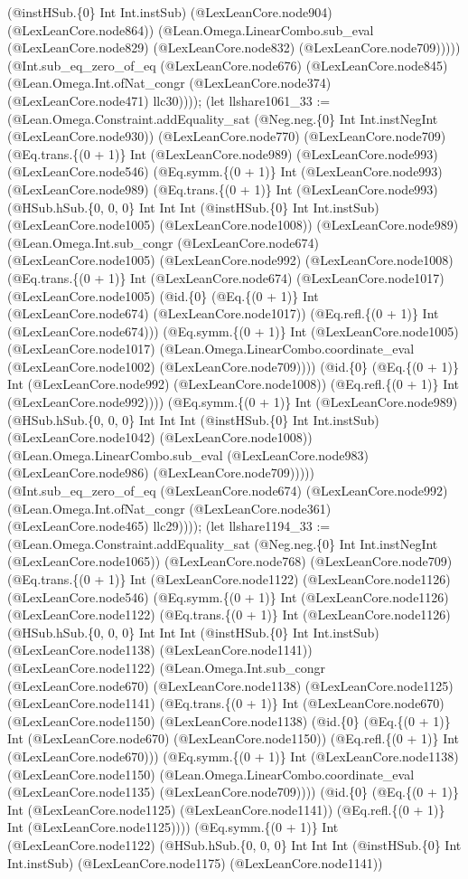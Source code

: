 \documentclass[11pt]{article}
\begin{document}
(@instHSub.\{0\} Int Int.instSub) (@LexLeanCore.node904) (@LexLeanCore.node864)) (@Lean.Omega.LinearCombo.sub\_eval (@LexLeanCore.node829) (@LexLeanCore.node832) (@LexLeanCore.node709))))) (@Int.sub\_eq\_zero\_of\_eq (@LexLeanCore.node676) (@LexLeanCore.node845) (@Lean.Omega.Int.ofNat\_congr (@LexLeanCore.node374) (@LexLeanCore.node471) llc30)))); (let llshare1061\_33 := (@Lean.Omega.Constraint.addEquality\_sat (@Neg.neg.\{0\} Int Int.instNegInt (@LexLeanCore.node930)) (@LexLeanCore.node770) (@LexLeanCore.node709) (@Eq.trans.\{(0 + 1)\} Int (@LexLeanCore.node989) (@LexLeanCore.node993) (@LexLeanCore.node546) (@Eq.symm.\{(0 + 1)\} Int (@LexLeanCore.node993) (@LexLeanCore.node989) (@Eq.trans.\{(0 + 1)\} Int (@LexLeanCore.node993) (@HSub.hSub.\{0, 0, 0\} Int Int Int (@instHSub.\{0\} Int Int.instSub) (@LexLeanCore.node1005) (@LexLeanCore.node1008)) (@LexLeanCore.node989) (@Lean.Omega.Int.sub\_congr (@LexLeanCore.node674) (@LexLeanCore.node1005) (@LexLeanCore.node992) (@LexLeanCore.node1008) (@Eq.trans.\{(0 + 1)\} Int (@LexLeanCore.node674) (@LexLeanCore.node1017) (@LexLeanCore.node1005) (@id.\{0\} (@Eq.\{(0 + 1)\} Int (@LexLeanCore.node674) (@LexLeanCore.node1017)) (@Eq.refl.\{(0 + 1)\} Int (@LexLeanCore.node674))) (@Eq.symm.\{(0 + 1)\} Int (@LexLeanCore.node1005) (@LexLeanCore.node1017) (@Lean.Omega.LinearCombo.coordinate\_eval (@LexLeanCore.node1002) (@LexLeanCore.node709)))) (@id.\{0\} (@Eq.\{(0 + 1)\} Int (@LexLeanCore.node992) (@LexLeanCore.node1008)) (@Eq.refl.\{(0 + 1)\} Int (@LexLeanCore.node992)))) (@Eq.symm.\{(0 + 1)\} Int (@LexLeanCore.node989) (@HSub.hSub.\{0, 0, 0\} Int Int Int (@instHSub.\{0\} Int Int.instSub) (@LexLeanCore.node1042) (@LexLeanCore.node1008)) (@Lean.Omega.LinearCombo.sub\_eval (@LexLeanCore.node983) (@LexLeanCore.node986) (@LexLeanCore.node709))))) (@Int.sub\_eq\_zero\_of\_eq (@LexLeanCore.node674) (@LexLeanCore.node992) (@Lean.Omega.Int.ofNat\_congr (@LexLeanCore.node361) (@LexLeanCore.node465) llc29)))); (let llshare1194\_33 := (@Lean.Omega.Constraint.addEquality\_sat (@Neg.neg.\{0\} Int Int.instNegInt (@LexLeanCore.node1065)) (@LexLeanCore.node768) (@LexLeanCore.node709) (@Eq.trans.\{(0 + 1)\} Int (@LexLeanCore.node1122) (@LexLeanCore.node1126) (@LexLeanCore.node546) (@Eq.symm.\{(0 + 1)\} Int (@LexLeanCore.node1126) (@LexLeanCore.node1122) (@Eq.trans.\{(0 + 1)\} Int (@LexLeanCore.node1126) (@HSub.hSub.\{0, 0, 0\} Int Int Int (@instHSub.\{0\} Int Int.instSub) (@LexLeanCore.node1138) (@LexLeanCore.node1141)) (@LexLeanCore.node1122) (@Lean.Omega.Int.sub\_congr (@LexLeanCore.node670) (@LexLeanCore.node1138) (@LexLeanCore.node1125) (@LexLeanCore.node1141) (@Eq.trans.\{(0 + 1)\} Int (@LexLeanCore.node670) (@LexLeanCore.node1150) (@LexLeanCore.node1138) (@id.\{0\} (@Eq.\{(0 + 1)\} Int (@LexLeanCore.node670) (@LexLeanCore.node1150)) (@Eq.refl.\{(0 + 1)\} Int (@LexLeanCore.node670))) (@Eq.symm.\{(0 + 1)\} Int (@LexLeanCore.node1138) (@LexLeanCore.node1150) (@Lean.Omega.LinearCombo.coordinate\_eval (@LexLeanCore.node1135) (@LexLeanCore.node709)))) (@id.\{0\} (@Eq.\{(0 + 1)\} Int (@LexLeanCore.node1125) (@LexLeanCore.node1141)) (@Eq.refl.\{(0 + 1)\} Int (@LexLeanCore.node1125)))) (@Eq.symm.\{(0 + 1)\} Int (@LexLeanCore.node1122) (@HSub.hSub.\{0, 0, 0\} Int Int Int (@instHSub.\{0\} Int Int.instSub) (@LexLeanCore.node1175) (@LexLeanCore.node1141)) 
\end{document}
